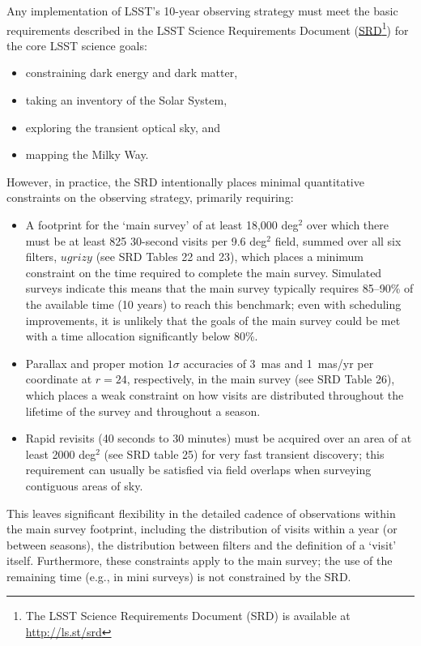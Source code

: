 \documentclass[DM,lsstdraft,toc,usenatbib]{lsstdoc}
\begin{document}
Any implementation of LSST's 10-year observing strategy must meet the basic requirements described in the 
LSST Science Requirements Document (\href{http://ls.st/srd}{SRD}\footnote{The LSST Science 
Requirements Document (SRD) is available at \href{http://ls.st/srd}{http://ls.st/srd}})
for the core LSST science goals:
\begin{itemize}
\item constraining dark energy and dark matter,
\item taking an inventory of the Solar System,
\item exploring the transient optical sky, and
\item mapping the Milky Way.
\end{itemize}
However, in practice, the SRD intentionally places minimal quantitative constraints on the observing strategy,
primarily requiring:
\begin{itemize} 
\item A footprint for the `main survey' of at least 18,000 deg$^2$ over which there must be
at least 825 30-second visits per 9.6 deg$^2$ field, summed over all six filters, $ugrizy$ (see SRD 
Tables 22 and 23), which places a minimum constraint on the time required to complete 
the main survey. Simulated surveys indicate this means that the main survey typically requires 85--90\% 
of the available time (10 years) to reach this benchmark; even with scheduling improvements, it is unlikely 
that the goals of the main survey could be met with a time allocation significantly below 80\%. 
\item Parallax and proper motion $1\sigma$ accuracies of 3~mas and 1~mas/yr per coordinate at $r=24$, 
respectively, in the main survey (see SRD Table 26), which places
a weak constraint on how visits are distributed throughout the lifetime of the survey and throughout a season.
\item Rapid revisits (40 seconds to 30 minutes) must be acquired over an area of at least 2000 deg$^2$ (see SRD table 25) for
very fast transient discovery; this requirement can usually be satisfied via field overlaps when surveying contiguous areas of sky. 
\end{itemize}
This leaves significant flexibility in the detailed cadence of observations within
the main survey footprint, including the distribution of visits within a year (or between seasons), the distribution between filters and 
the definition of a `visit' itself. Furthermore, these constraints apply to the main survey; the use of the 
remaining time (e.g., in mini surveys) is not constrained by the SRD.
\end{document}
